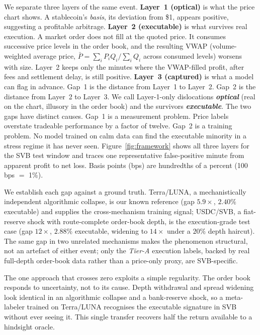 \documentclass[sigconf,anonymous,natbib=false]{acmart}
\begin{document}
We separate three layers of the same event.
\textbf{Layer~1 (optical)} is what the price chart shows. A stablecoin's
\emph{basis}, its deviation from \$1, appears positive, suggesting a
profitable arbitrage.
\textbf{Layer~2 (executable)} is what survives real execution.  A market
order does not fill at the quoted price. It consumes successive price
levels in the order book, and the resulting VWAP (volume-weighted average
price, $\bar{P}=\sum_i P_i Q_i / \sum_i Q_i$ across consumed levels)
worsens with size.  Layer~2 keeps only the minutes where the VWAP-filled
profit, after fees and settlement delay, is still positive.
\textbf{Layer~3 (captured)} is what a model can flag in advance.
Gap~1 is the distance from Layer~1 to Layer~2. Gap~2 is the distance from Layer~2 to
Layer~3.
We call Layer-1-only dislocations \textbf{\emph{optical}} (real on the
chart, illusory in the order book) and the survivors
\textbf{\emph{executable}}.
The two gaps have distinct causes. Gap~1 is a measurement problem. Price
labels overstate tradeable performance by a factor of twelve. Gap~2 is a
training problem. No model trained on calm data can find the executable
minority in a stress regime it has never seen.
Figure~\ref{fig:framework} shows all three layers for the SVB test
window and traces one representative false-positive minute from
apparent profit to net loss.
Basis points (bps) are hundredths of a percent (100\,bps $=$ 1\%).

We establish each gap against a ground truth. Terra/LUNA, a mechanistically
independent algorithmic collapse, is our known reference (gap $5.9\times$,
$2.40\%$ executable) and supplies the cross-mechanism training signal; USDC/SVB,
a fiat-reserve shock with route-complete order-book depth, is the execution-grade
test case (gap $12\times$, $2.88\%$ executable, widening to $14\times$ under a
$20\%$ depth haircut). The same gap in two unrelated mechanisms makes the
phenomenon structural, not an artefact of either event; only the \emph{Tier-A}
execution labels, backed by real full-depth order-book data rather than a
price-only proxy, are SVB-specific.

The one approach that crosses zero exploits a simple regularity. The
order book responds to uncertainty, not to its cause.
Depth withdrawal and spread widening look identical in an algorithmic
collapse and a bank-reserve shock, so a meta-labeler trained on
Terra/LUNA recognises the executable signature in SVB without ever
seeing it.
This single transfer recovers half the return available to a hindsight
oracle.
\end{document}
